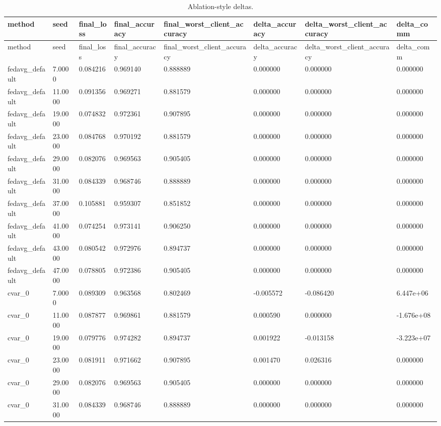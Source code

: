 \documentclass[11pt]{report}
\begin{document}
\begin{longtable}{llllllll}
\caption{Ablation-style deltas.}\\
\toprule
method & seed & final\_loss & final\_accuracy & final\_worst\_client\_accuracy & delta\_accuracy & delta\_worst\_client\_accuracy & delta\_comm \\
\midrule
\endfirsthead
\toprule
method & seed & final\_loss & final\_accuracy & final\_worst\_client\_accuracy & delta\_accuracy & delta\_worst\_client\_accuracy & delta\_comm \\
\midrule
\endhead
fedavg\_default & 7.0000 & 0.084216 & 0.969140 & 0.888889 & 0.000000 & 0.000000 & 0.000000 \\
fedavg\_default & 11.0000 & 0.091356 & 0.969271 & 0.881579 & 0.000000 & 0.000000 & 0.000000 \\
fedavg\_default & 19.0000 & 0.074832 & 0.972361 & 0.907895 & 0.000000 & 0.000000 & 0.000000 \\
fedavg\_default & 23.0000 & 0.084768 & 0.970192 & 0.881579 & 0.000000 & 0.000000 & 0.000000 \\
fedavg\_default & 29.0000 & 0.082076 & 0.969563 & 0.905405 & 0.000000 & 0.000000 & 0.000000 \\
fedavg\_default & 31.0000 & 0.084339 & 0.968746 & 0.888889 & 0.000000 & 0.000000 & 0.000000 \\
fedavg\_default & 37.0000 & 0.105881 & 0.959307 & 0.851852 & 0.000000 & 0.000000 & 0.000000 \\
fedavg\_default & 41.0000 & 0.074254 & 0.973141 & 0.906250 & 0.000000 & 0.000000 & 0.000000 \\
fedavg\_default & 43.0000 & 0.080542 & 0.972976 & 0.894737 & 0.000000 & 0.000000 & 0.000000 \\
fedavg\_default & 47.0000 & 0.078805 & 0.972386 & 0.905405 & 0.000000 & 0.000000 & 0.000000 \\
cvar\_0 & 7.0000 & 0.089309 & 0.963568 & 0.802469 & -0.005572 & -0.086420 & 6.447e+06 \\
cvar\_0 & 11.0000 & 0.087877 & 0.969861 & 0.881579 & 0.000590 & 0.000000 & -1.676e+08 \\
cvar\_0 & 19.0000 & 0.079776 & 0.974282 & 0.894737 & 0.001922 & -0.013158 & -3.223e+07 \\
cvar\_0 & 23.0000 & 0.081911 & 0.971662 & 0.907895 & 0.001470 & 0.026316 & 0.000000 \\
cvar\_0 & 29.0000 & 0.082076 & 0.969563 & 0.905405 & 0.000000 & 0.000000 & 0.000000 \\
cvar\_0 & 31.0000 & 0.084339 & 0.968746 & 0.888889 & 0.000000 & 0.000000 & 0.000000 \\

\end{longtable}
\end{document}

